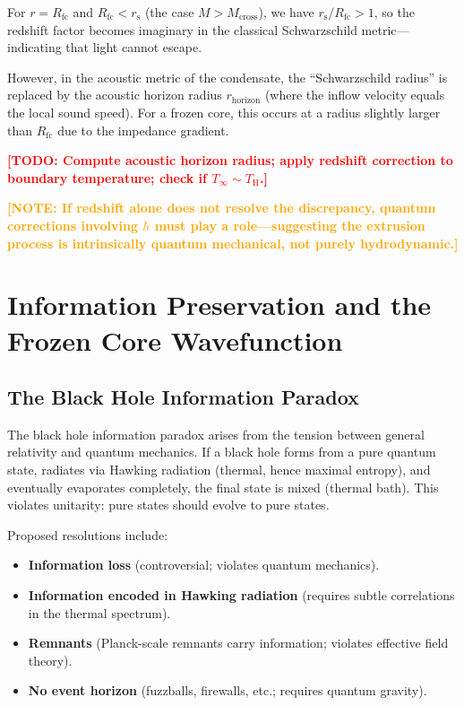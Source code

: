 \documentclass[12pt,a4paper]{article}
\newcommand{\TODO}[1]{\textcolor{red}{\textbf{[TODO: #1]}}}
\newcommand{\NOTE}[1]{\textcolor{orange}{\textbf{[NOTE: #1]}}}
\newcommand{\Rfc}{R_\text{fc}}
\newcommand{\Mcross}{M_\text{cross}}
\newcommand{\TH}{T_\text{H}}
\theoremstyle{definition}
\begin{document}
For $r = \Rfc$ and $\Rfc < r_\text{s}$ (the case $M > \Mcross$), we have $r_\text{s}/\Rfc > 1$, so the redshift factor becomes imaginary in the classical Schwarzschild metric—indicating that light cannot escape.

However, in the acoustic metric of the condensate, the ``Schwarzschild radius'' is replaced by the acoustic horizon radius $r_\text{horizon}$ (where the inflow velocity equals the local sound speed). For a frozen core, this occurs at a radius slightly larger than $\Rfc$ due to the impedance gradient.

\TODO{Compute acoustic horizon radius; apply redshift correction to boundary temperature; check if $T_\infty \sim \TH$.}

\NOTE{If redshift alone does not resolve the discrepancy, quantum corrections involving $\hbar$ must play a role—suggesting the extrusion process is intrinsically quantum mechanical, not purely hydrodynamic.}

\section{Information Preservation and the Frozen Core Wavefunction}
\label{sec:information}

\subsection{The Black Hole Information Paradox}
\label{subsec:information_paradox}

The black hole information paradox \cite{Hawking1976,Preskill1992,Almheiri2013} arises from the tension between general relativity and quantum mechanics. If a black hole forms from a pure quantum state, radiates via Hawking radiation (thermal, hence maximal entropy), and eventually evaporates completely, the final state is mixed (thermal bath). This violates unitarity: pure states should evolve to pure states.

Proposed resolutions include:
\begin{itemize}
  \item \textbf{Information loss} (controversial; violates quantum mechanics).
  \item \textbf{Information encoded in Hawking radiation} (requires subtle correlations in the thermal spectrum).
  \item \textbf{Remnants} (Planck-scale remnants carry information; violates effective field theory).
  \item \textbf{No event horizon} (fuzzballs, firewalls, etc.; requires quantum gravity).
\end{itemize}
\end{document}

